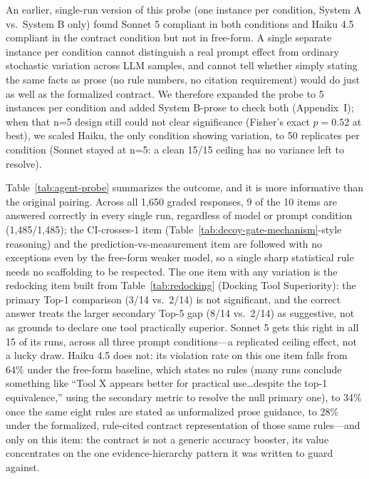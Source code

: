 \documentclass{article}
\begin{document}
An earlier, single-run version of this probe (one instance per condition, System A vs.\ System B only) found Sonnet 5 compliant in both conditions and Haiku 4.5 compliant in the contract condition but not in free-form. A single separate instance per condition cannot distinguish a real prompt effect from ordinary stochastic variation across LLM samples, and cannot tell whether simply stating the same facts as prose (no rule numbers, no citation requirement) would do just as well as the formalized contract. We therefore expanded the probe to 5 instances per condition and added System B-prose to check both (Appendix~I); when that n=5 design still could not clear significance (Fisher's exact $p=0.52$ at best), we scaled Haiku, the only condition showing variation, to 50 replicates per condition (Sonnet stayed at n=5: a clean 15/15 ceiling has no variance left to resolve).

Table~\ref{tab:agent-probe} summarizes the outcome, and it is more informative than the original pairing. Across all 1,650 graded responses, 9 of the 10 items are answered correctly in every single run, regardless of model or prompt condition (1,485/1,485); the CI-crosses-1 item (Table~\ref{tab:decoy-gate-mechanism}-style reasoning) and the prediction-vs-measurement item are followed with no exceptions even by the free-form weaker model, so a single sharp statistical rule needs no scaffolding to be respected. The one item with any variation is the redocking item built from Table~\ref{tab:redocking} (Docking Tool Superiority): the primary Top-1 comparison (3/14 vs.\ 2/14) is not significant, and the correct answer treats the larger secondary Top-5 gap (8/14 vs.\ 2/14) as suggestive, not as grounds to declare one tool practically superior. Sonnet 5 gets this right in all 15 of its runs, across all three prompt conditions---a replicated ceiling effect, not a lucky draw. Haiku 4.5 does not: its violation rate on this one item falls from 64\% under the free-form baseline, which states no rules (many runs conclude something like ``Tool X appears better for practical use\ldots despite the top-1 equivalence,'' using the secondary metric to resolve the null primary one), to 34\% once the same eight rules are stated as unformalized prose guidance, to 28\% under the formalized, rule-cited contract representation of those same rules---and only on this item: the contract is not a generic accuracy booster, its value concentrates on the one evidence-hierarchy pattern it was written to guard against.
\end{document}
